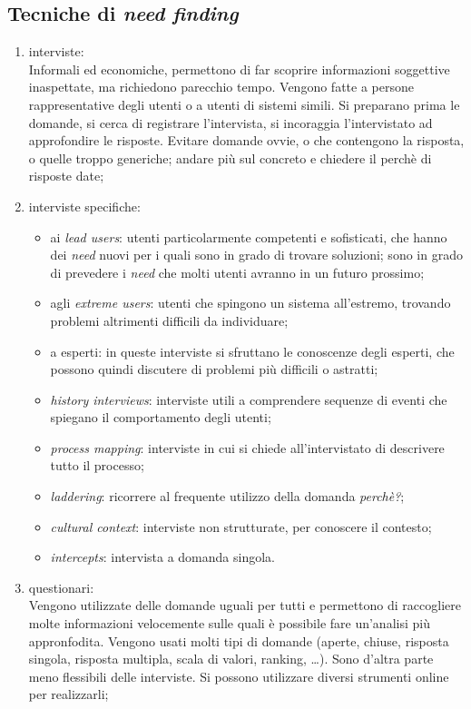 \subsection{Tecniche di \textit{need finding}}
\begin{enumerate}
	\item interviste: \\Informali ed economiche, permettono di far scoprire informazioni soggettive inaspettate, ma richiedono parecchio tempo. Vengono fatte a persone rappresentative degli utenti o a utenti di sistemi simili. Si preparano prima le domande, si cerca di registrare l'intervista, si incoraggia l'intervistato ad approfondire le risposte. Evitare domande ovvie, o che contengono la risposta, o quelle troppo generiche; andare pi\`u sul concreto e chiedere il perch\`e di risposte date;
	\item interviste specifiche:
	\begin{itemize}
		\item ai \textit{lead users}: utenti particolarmente competenti e sofisticati, che hanno dei \textit{need} nuovi per i quali sono in grado di trovare soluzioni; sono in grado di prevedere i \textit{need} che molti utenti avranno in un futuro prossimo;
		\item agli \textit{extreme users}: utenti che spingono un sistema all'estremo, trovando problemi altrimenti difficili da individuare;
		\item a esperti: in queste interviste si sfruttano le conoscenze degli esperti, che possono quindi discutere di problemi pi\`u difficili o astratti;
		\item \textit{history interviews}: interviste utili a comprendere sequenze di eventi che spiegano il comportamento degli utenti;
		\item \textit{process mapping}: interviste in cui si chiede all'intervistato di descrivere tutto il processo;
		\item \textit{laddering}: ricorrere al frequente utilizzo della domanda \textit{perch\`e?};
		\item \textit{cultural context}: interviste non strutturate, per conoscere il contesto;
		\item \textit{intercepts}: intervista a domanda singola.
	\end{itemize}
	\item questionari: \\Vengono utilizzate delle domande uguali per tutti e permettono di raccogliere molte informazioni velocemente sulle quali \`e possibile fare un'analisi pi\`u appronfodita. Vengono usati molti tipi di domande (aperte, chiuse, risposta singola, risposta multipla, scala di valori, ranking, \ldots). Sono d'altra parte meno flessibili delle interviste. Si possono utilizzare diversi strumenti online per realizzarli;

\end{enumerate}
